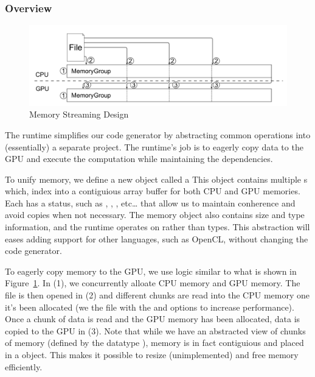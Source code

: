 \subsubsection{Overview}


\begin{figure}
\centering
\includegraphics[scale=0.2]{fig/memory_group.pdf}
\caption{Memory Streaming Design}
\label{fig:memorygroup}
\centering
\end{figure}

The runtime simplifies our code generator by abstracting common operations
	into (essentially) a separate project.
The runtime's job is to eagerly copy data to the GPU and execute the
 	computation while maintaining the dependencies.

To unify memory, we define a new object called a 
This object contains multiple s which,
	index into a contiguious array buffer for both CPU and GPU memories.
Each  has a status, such as
	, ,
	, etc\ldots
	that allow us to maintain conherence and avoid copies when
	not necessary.
The memory object also contains size and type information,
	and the runtime operates on  rather than 
	types.
This abstraction will eases adding support for other languages, such
	as OpenCL, without changing the code generator.

To eagerly copy memory to the GPU, we use logic similar to what is
	shown in Figure~\ref{fig:memorygroup}.
In (1), we concurrently alloate CPU memory and GPU memory.
The file is then opened in (2) and different chunks are read into
	the CPU memory one it's been allocated (we  the file
	with the  and  options to increase
	performance).
Once a chunk of data is read and the GPU memory has been allocated, data
	is copied to the GPU in (3).
Note that while we have an abstracted view of chunks of memory
	(defined by the datatype ), memory is in fact
	contiguious and placed in a  object.
This makes it possible to resize (unimplemented) and free memory efficiently.
